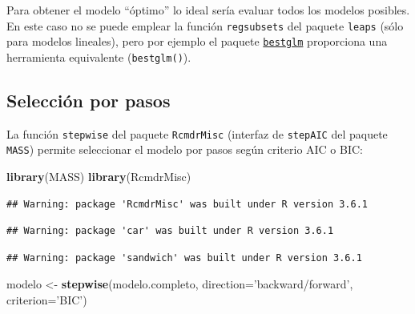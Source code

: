 \documentclass[]{book}
\newenvironment{Shaded}{\begin{snugshade}}{\end{snugshade}}
\newcommand{\DataTypeTok}[1]{\textcolor[rgb]{0.13,0.29,0.53}{#1}}
\newcommand{\KeywordTok}[1]{\textcolor[rgb]{0.13,0.29,0.53}{\textbf{#1}}}
\newcommand{\NormalTok}[1]{#1}
\newcommand{\StringTok}[1]{\textcolor[rgb]{0.31,0.60,0.02}{#1}}
\begin{document}
Para obtener el modelo ``óptimo'' lo ideal sería evaluar todos los modelos posibles.
En este caso no se puede emplear la función \texttt{regsubsets} del paquete \texttt{leaps} (sólo para modelos lineales),
pero por ejemplo el paquete
\href{https://cran.r-project.org/web/packages/bestglm/vignettes/bestglm.pdf}{\texttt{bestglm}}
proporciona una herramienta equivalente (\texttt{bestglm()}).

\hypertarget{seleccion-por-pasos-1}{%
\subsection{Selección por pasos}\label{seleccion-por-pasos-1}}

La función \texttt{stepwise} del paquete \texttt{RcmdrMisc} (interfaz de \texttt{stepAIC} del paquete \texttt{MASS})
permite seleccionar el modelo por pasos según criterio AIC o BIC:

\begin{Shaded}
\begin{Highlighting}[]
\KeywordTok{library}\NormalTok{(MASS)}
\KeywordTok{library}\NormalTok{(RcmdrMisc)}
\end{Highlighting}
\end{Shaded}

\begin{verbatim}
## Warning: package 'RcmdrMisc' was built under R version 3.6.1
\end{verbatim}

\begin{verbatim}
## Warning: package 'car' was built under R version 3.6.1
\end{verbatim}

\begin{verbatim}
## Warning: package 'sandwich' was built under R version 3.6.1
\end{verbatim}

\begin{Shaded}
\begin{Highlighting}[]
\NormalTok{modelo <-}\StringTok{ }\KeywordTok{stepwise}\NormalTok{(modelo.completo, }\DataTypeTok{direction=}\StringTok{'backward/forward'}\NormalTok{, }\DataTypeTok{criterion=}\StringTok{'BIC'}\NormalTok{)}
\end{Highlighting}
\end{Shaded}
\end{document}
